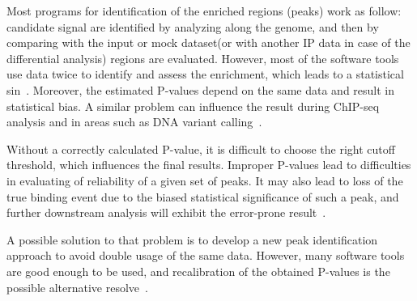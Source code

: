 Most programs for identification of the enriched regions (peaks) work as follow: candidate signal are identified by analyzing along the genome, and then by comparing with the input or mock dataset(or with another IP data in case of the differential analysis) regions are evaluated. 
However, most of the software tools use data twice to identify and assess the enrichment, which leads to a statistical sin~\cite{lun2014novo}. 
Moreover, the estimated P-values depend on the same data and result in statistical bias.
A similar problem can influence the result during ChIP-seq analysis and in areas such as DNA variant calling~\cite{chitpin2019recap}.

Without a correctly calculated P-value, it is difficult to choose the right cutoff threshold, which influences the final results. 
Improper P-values lead to difficulties in evaluating of reliability of a given set of peaks.
It may also lead to loss of the true binding event due to the biased statistical significance of such a peak, and further downstream analysis will exhibit the error-prone result~\cite{chitpin2019recap}. 

A possible solution to that problem is to develop a new peak identification approach to avoid double usage of the same data. 
However, many software tools are good enough to be used, and recalibration of the obtained P-values is the possible alternative resolve~\cite{chitpin2019recap}.

\section{}